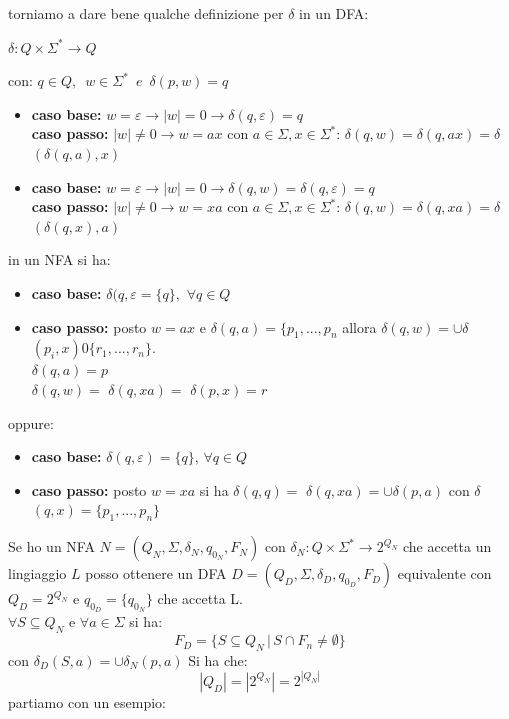 torniamo a dare bene qualche definizione per {$\delta$} in un DFA:
\begin{center}
	$\delta:Q\times \Sigma^* \to Q$
\end{center}
con: $q\in Q,\,\,\, w\in \Sigma^*\,\,\,e\,\,\,${$\delta$}$(p,w)=q$
\begin{itemize}
	\item
	      \textbf{caso base:} $w=\varepsilon\to |w|=0\to${$\delta$}$(q,\varepsilon)=q$
	      \\
	      \textbf{caso passo:} $|w|\neq0\to w=ax$ con $a\in \Sigma,x\in \Sigma^*$:
	      {$\delta$}$(q,w)=${$\delta$}$(q,ax)=${$\delta$} $(\delta(q,a),x)$
	\item
	      \textbf{caso base:} $w=\varepsilon\to |w|=0\to \delta(q,w)=\delta(q,\varepsilon)=q$
	      \\
	      \textbf{caso passo:} $|w|\neq0\to w=xa$ con $a\in \Sigma,x\in \Sigma^*$:
	      {$\delta$}$(q,w)=${$\delta$}$(q,xa)=${$\delta$} $(\delta(q,x),a)$
\end{itemize}
in un NFA si ha:
\begin{itemize}
	\item \textbf{caso base:}  {$\delta$}$(q,\varepsilon=\{q\},\,\,\forall q\in Q$
	\item \textbf{caso passo:} posto $w=ax$ e {$\delta$}$(q,a)=\{p_1,...,p_n$ allora {$\delta$}$(q,w)=\cup${$\delta$}$(p_i, x)0\{r_1,...,r_n\}$.\\
	      {$\delta$}$(q,a)=p$\\
	      {$\delta$}$(q,w)=$ {$\delta$}$(q,xa)=$ {$\delta$}$(p,x)=r$
\end{itemize}
oppure:
\begin{itemize}
	\item \textbf{caso base:}  {$\delta$}$(q,\varepsilon)=\{q\},\,\forall q\in Q$
	\item \textbf{caso passo:} posto $w=xa$ si ha  {$\delta$}$(q,q)=$ {$\delta$}$(q,xa)=\cup \delta(p,a)$ con  {$\delta$}$(q,x)=\{p_1,...,p_n\}$
\end{itemize}
Se ho un NFA $N=(Q_N, \Sigma, \delta_N, q_{0_N}, F_N)$ con $\delta_N: Q\times\Sigma^*\to 2^{Q_N}$ che accetta un lingiaggio $L$ posso ottenere un DFA $D=(Q_D, \Sigma, \delta_D, q_{0_D}, F_D)$ equivalente con $Q_D=2^{Q_N}$  e $q_{0_D}=\{q_{0_N}\}$ che accetta L.\\
$\forall S\subseteq Q_N$ e $\forall a\in \Sigma$ si ha:
$$F_D=\{S\subseteq Q_N\,|\, S\cap F_n\neq \emptyset\}$$
con $\delta_D(S,a)=\cup \delta_N(p,a)$
Si ha che:
$$|Q_D|=|2^{Q_N}|=2^{|Q_N|}$$
partiamo con un esempio:
